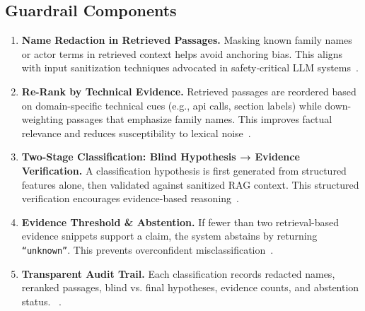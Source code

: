 \subsection{Guardrail Components}
\begin{enumerate}
      \item \textbf{Name Redaction in Retrieved Passages.}
            Masking known family names or actor terms in retrieved context helps avoid anchoring bias.
            This aligns with input sanitization techniques advocated in safety‐critical LLM systems~\cite{han2025guardrail}.

      \item \textbf{Re-Rank by Technical Evidence.}
            Retrieved passages are reordered based on domain-specific technical cues (e.g., \gls{api}
            calls, section labels) while down-weighting passages that emphasize family names. This
            improves factual relevance and reduces susceptibility to lexical
            noise~\cite{zhang2025hallucination, magesh2025assessing}.

      \item \textbf{Two-Stage Classification: Blind Hypothesis → Evidence Verification.}
            A classification hypothesis is first generated from structured features alone, then
            validated against sanitized RAG context. This structured verification encourages
            evidence-based reasoning~\cite{bechard2024reducing, lee2025finetune}.

      \item \textbf{Evidence Threshold \& Abstention.}
            If fewer than two retrieval-based evidence snippets support a claim, the system abstains by
            returning \texttt{``unknown''}. This prevents overconfident misclassification~\cite{han2025guardrail,
                  magesh2025assessing}.

      \item \textbf{Transparent Audit Trail.}
            Each classification records redacted names, reranked passages, blind vs. final
            hypotheses, evidence counts, and abstention status. ~\cite{han2025guardrail}.
\end{enumerate}

